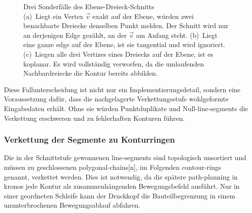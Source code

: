                 \begin{figure}[ht]
                    \centering
                    \resizebox{\linewidth}{!}{%
                        
                    }
                    \caption[Sonderfälle des Ebene-Dreieck-Schnitts]{
                        Drei Sonderfälle des Ebene-Dreieck-Schnitts\\
                        (a)~Liegt ein Vertex $\vec{v}$ exakt auf der Ebene, würden zwei benachbarte Dreiecke denselben Punkt melden. Der Schnitt wird nur an derjenigen Edge gezählt, an der $\vec{v}$ am Anfang steht.
                        (b)~Liegt eine ganze \gls{edge} auf der Ebene, ist sie tangential und wird ignoriert.
                        (c)~Liegen alle drei Vertizes eines Dreiecks auf der Ebene, ist es koplanar. Es wird vollständig verworfen, da die umlaufenden Nachbardreiecke die Kontur bereits abbilden.%
                    }
                    \label{fig:concept-planar-special-cases}
                \end{figure}

                Diese Fallunterscheidung ist nicht nur ein Implementierungsdetail, sondern eine Voraussetzung dafür, dass die nachgelagerte Verkettungsstufe wohlgeformte Eingabedaten erhält.
                Ohne sie würden Punktduplikate und Null-\glspl{line-segment} die Verkettung erschweren und zu fehlerhaften Konturen führen.

            \subsubsection{Verkettung der Segmente zu Konturringen}\label{subsubsec:concept-planar-contour-chaining} 
                Die in der Schnittstufe gewonnenen \glspl{line-segment} sind topologisch unsortiert und müssen zu geschlossenen \glspl{polygonal-chain}[n], im Folgenden \glspl{contour-ring} genannt, verkettet werden.
                Dies ist notwendig, da die spätere \gls{path-planning} in \ac{kronos} jede Kontur als zusammenhängenden Bewegungsbefehl ausführt.
                Nur in einer geordneten Schleife kann der Druckkopf die Bauteilbegrenzung in einem ununterbrochenen Bewegungsablauf abfahren.

